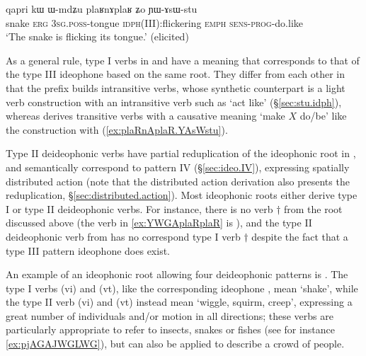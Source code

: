 \begin{exe}
\ex \label{ex:plaRnAplaR.YAsWstu}
\gll  qapri kɯ ɯ-mdʑu plaʁnɤplaʁ ʑo ɲɯ-ɤsɯ-stu \\
snake \textsc{erg} \textsc{3sg}.\textsc{poss}-tongue \textsc{idph}(III):flickering \textsc{emph} \textsc{sens}-\textsc{prog}-do.like \\
\glt `The snake is flicking its tongue.' (elicited)
\end{exe}

As a general rule, type I verbs in  and  have a meaning that corresponds to that of the type III ideophone based on the same root. They differ from each other in that the prefix  builds intransitive verbs, whose synthetic counterpart is a light verb construction with an intransitive verb such as  `act like' (§\ref{sec:stu.idph}), whereas  derives transitive verbs with a causative meaning `make $X$ do/be' like the construction with  (\ref{ex:plaRnAplaR.YAsWstu}).
 

Type II deideophonic verbs have partial reduplication of the ideophonic root in , and semantically correspond to pattern IV (§\ref{sec:ideo.IV}), expressing spatially distributed action (note that the distributed action derivation also presents the  reduplication, §\ref{sec:distributed.action}). Most ideophonic roots either derive type I or type II deideophonic verbs. For instance, there is no verb $\dagger$ from the root  discussed above (the verb in \ref{ex:YWGAplaRplaR} is ), 
and the type II  deideophonic verb  from  has no correspond type I verb $\dagger$ despite the fact that a type III pattern ideophone  does exist.

An example of an ideophonic root allowing four deideophonic patterns is . The type I verbs  (vi) and  (vt), like the corresponding ideophone , mean `shake', while the type II verb  (vi) and  (vt) instead mean `wiggle, squirm, creep', expressing a great number of individuals and/or motion in all directions; these verbs are particularly appropriate to refer to insects, snakes or fishes (see for instance \ref{ex:pjAGAJWGLWG}), but can also be applied to describe a crowd of people. 
 
